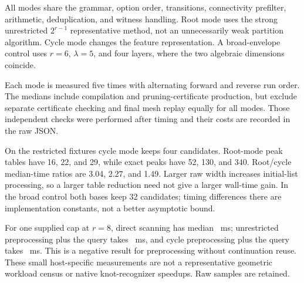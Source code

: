 \documentclass[11pt,a4paper]{article}
\theoremstyle{definition}
\theoremstyle{remark}
\begin{document}
All modes share the grammar, option order, transitions, connectivity prefilter, arithmetic,
deduplication, and witness handling. Root mode uses the strong unrestricted $2^{r-1}$
representative method, not an unnecessarily weak partition algorithm. Cycle mode changes
the feature representation. A broad-envelope control uses $r=6$, $\lambda=5$, and four
layers, where the two algebraic dimensions coincide.

Each mode is measured five times with alternating forward and reverse run order. The
medians include compilation and pruning-certificate production, but exclude separate
certificate checking and final mesh replay equally for all modes. Those independent
checks were performed after timing and their costs are recorded in the raw JSON.

\begin{table}[htbp]
\centering\small
\caption{Median complete abstract-grammar search times. Root/cycle compares the
unrestricted-basis median to the cycle-envelope median.}\label{tab:times}
\end{table}


\begin{table}[htbp]
\centering\small
\caption{Peak stored candidates and generated-candidate work. The work ratio includes
the explicit initial list.}\label{tab:work}
\end{table}


On the restricted fixtures cycle mode keeps four candidates. Root-mode peak tables have
16, 22, and 29, while exact peaks have 52, 130, and 340. Root/cycle median-time ratios
are 3.04, 2.27, and 1.49. Larger raw width increases initial-list processing, so a larger
table reduction need not give a larger wall-time gain. In the broad control both bases
keep 32 candidates; timing differences there are implementation constants, not a better
asymptotic bound.

For one supplied cap at $r=8$, direct scanning has median \SingleDirect\ ms;
unrestricted preprocessing plus the query takes \SingleRoot\ ms, and cycle preprocessing
plus the query takes \SingleCycle\ ms. This is a negative result for preprocessing
without continuation reuse. These small host-specific measurements are not a representative
geometric workload census or native knot-recognizer speedups. Raw samples are retained.
\end{document}
